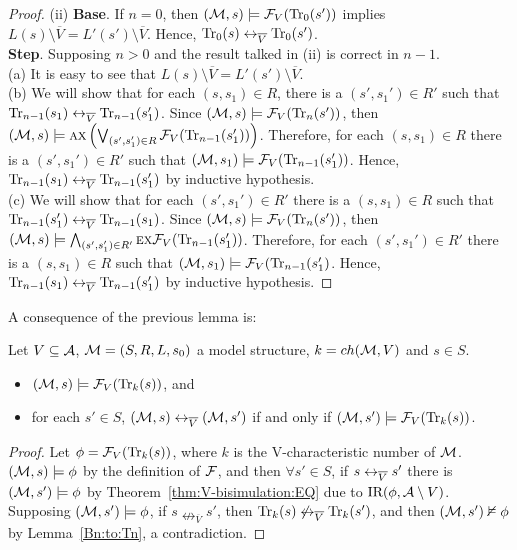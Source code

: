 \documentclass{article}
\begin{document}
\begin{proof}
(ii)  \textbf{Base}. If $n=0$, then $({\cal M}, s)  \models {\cal F}_V(\textrm{Tr}_0(s'))$ implies $L(s) \setminus \overline V = L'(s') \setminus \overline V$. Hence, $\textrm{Tr}_0(s) \leftrightarrow_{\overline V} \textrm{Tr}_0(s')$.\\
    \textbf{Step}. Supposing $n>0$ and the result talked in (ii) is correct in $n-1$.\\
   (a) It is easy to see that $L(s) \setminus \overline V = L'(s') \setminus \overline V$.\\
   (b) We will show that for each $(s, s_1) \in R$, there is a $(s', s_1') \in R'$ such that $\textrm{Tr}_{n-1}(s_1) \leftrightarrow_{\overline V} \textrm{Tr}_{n-1}(s_1')$.
      Since $({\cal M}, s) \models {\cal F}_V(\textrm{Tr}_n(s'))$, then $({\cal M}, s) \models \textsc{a} \textsc{x}\left(\bigvee_{(s',s_1')\in R}{\cal F}_V(\textrm{Tr}_{n-1}(s_1') )\right)$.
      Therefore, for each $(s, s_1) \in R$ there is a $(s', s_1') \in R'$ such that $({\cal M}, s_1) \models {\cal F}_V(\textrm{Tr}_{n-1}(s_1') )$. Hence, $\textrm{Tr}_{n-1}(s_1) \leftrightarrow_{\overline V} \textrm{Tr}_{n-1}(s_1')$ by inductive hypothesis.\\
   (c) We will show that for each $(s',s_1')\in R'$ there is a $(s,s_1)\in R$ such that $\textrm{Tr}_{n-1}(s_1') \leftrightarrow_{\overline V} \textrm{Tr}_{n-1}(s_1)$.
      Since $({\cal M}, s) \models {\cal F}_V(\textrm{Tr}_n(s'))$, then $({\cal M}, s) \models  \bigwedge_{(s',s_1')\in R'} \textsc{e} \textsc{x} {\cal F}_V(\textrm{Tr}_{n-1}(s_1'))$.
      Therefore, for each $(s',s_1')\in R'$ there is a $(s,s_1)\in R$ such that $({\cal M}, s_1) \models {\cal F}_V(\textrm{Tr}_{n-1}(s_1')$.
      Hence, $\textrm{Tr}_{n-1}(s_1) \leftrightarrow_{\overline V} \textrm{Tr}_{n-1}(s_1')$ by inductive hypothesis.
\end{proof}


A consequence of the previous lemma is:

\begin{lemma}\label{div_s}
Let $V\subseteq {\cal A}$, ${\cal M}=(S,R,L,s_0)$ a model structure, $k={ch({\cal M},V)}$ and $s\in S$.
\begin{itemize}
  \item $({\cal M}, s)\models {\cal F}_V(\textrm{Tr}_k(s))$, and
  \item for each $s'\in S$, $({\cal M},s) \leftrightarrow_{\overline V} ({\cal M},s')$
  if and only if $({\cal M},s')\models{\cal F}_V(\textrm{Tr}_k(s))$.
\end{itemize}
\end{lemma}
\begin{proof}
Let $\phi = {\cal F}_V(\textrm{Tr}_k(s))$, where $k$ is the V-characteristic number of ${\cal M}$. $({\cal M}, s) \models \phi$ by the definition of ${\cal F}$, and then $\forall s' \in S$, if $s \leftrightarrow_{\overline V} s'$ there is $({\cal M}, s') \models \phi$ by Theorem~\ref{thm:V-bisimulation:EQ} due to $\textrm{IR}(\phi, {\cal A} \setminus V)$. Supposing $({\cal M}, s')\models \phi$, if $s \nleftrightarrow_{\overline V} s'$, then $\textrm{Tr}_k(s) \not \leftrightarrow_{\overline V} \textrm{Tr}_k(s')$, and then $({\cal M}, s')\nvDash \phi$ by Lemma~\ref{Bn:to:Tn}, a contradiction.
\end{proof}
\end{document}
